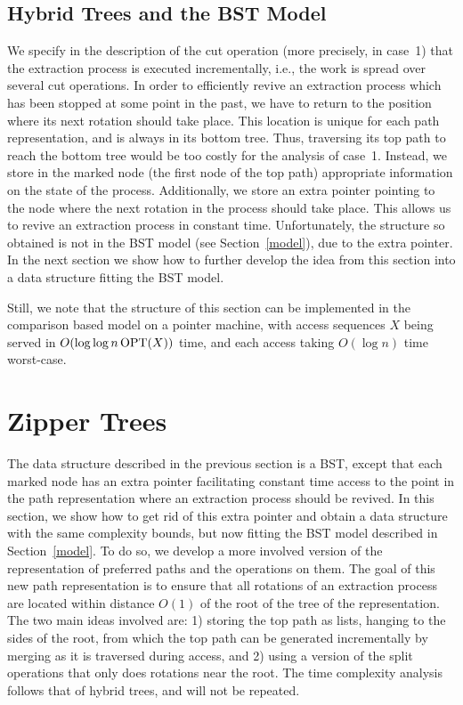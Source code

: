 \documentclass[letterpaper,11pt]{article}
\newcommand{\toppath}{top path}
\newcommand{\bottomtree}{bottom tree}
\begin{document}
\subsection{Hybrid Trees and the BST Model} 

We specify in the description of the cut operation (more precisely, in
case~1) that the extraction process is executed incrementally, i.e., the
work is spread over several cut operations. In order to efficiently revive 
an extraction process which has been stopped at some point in the past, we
have to return to the position where its next rotation should take
place. This location is unique for each path representation, and is always
in its \bottomtree{}. Thus, traversing its \toppath{} to reach the
\bottomtree{} would be too costly for the analysis of case~1. Instead, we
store in the marked node (the first node of the \toppath{}) appropriate
information on the state of the process. Additionally, we store an extra
pointer pointing to the node where the next rotation in the process should
take place. This allows us to revive an extraction process in constant
time. Unfortunately, the structure so obtained is not in the BST model (see
Section~\ref{model}), due to the extra pointer. In the next section we show
how to further develop the idea from this section into a data structure
fitting the BST model.

Still, we note that the structure of this section can be implemented in the
comparison based model on a pointer machine, with access sequences $X$
being served in $O(\log \log n \, {\rm OPT}(X))$ time, and each access
taking $O(\log n)$ time worst-case.

\section{Zipper Trees}
\label{zippertree}

The data structure described in the previous section is a BST, except that
each marked node has an extra pointer facilitating constant time access to
the point in the path representation where an extraction process should be
revived. In this section, we show how to get rid of this extra pointer and
obtain a data structure with the same complexity bounds, but now fitting
the BST model described in Section~\ref{model}. To do so, we develop a more
involved version of the representation of preferred paths and the
operations on them.
The goal of this new path representation is to ensure that all rotations of
an extraction process are located within distance $O(1)$ of the root of the
tree of the representation. The two main ideas involved are: 1) storing the
\toppath{} as lists,
hanging to the sides of the root, from which 
the \toppath{} can be generated incrementally by merging as it is traversed
during access, and 2) using a version of the split operations that only
does rotations near the root. The time complexity analysis follows that of
hybrid trees, and will not be repeated.
\end{document}
